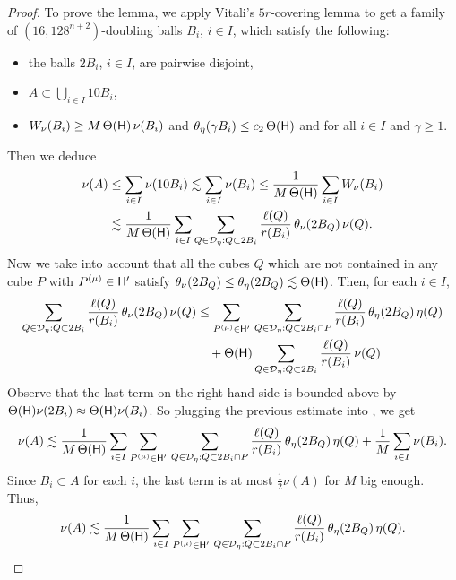 \begin{proof}
To prove the lemma, we apply Vitali's $5r$-covering lemma to get a family of $(16,128^{n+2})$-doubling balls $B_i$, $i\in I$,
which satisfy the following:
\begin{itemize}
\item the balls $2B_i$, $i\in I$, are pairwise disjoint,
\item $A\subset \bigcup_{i\in I} 10B_i$,
\item 
$W_\nu(B_i)\geq M\,\Theta({\mathsf{H}})\,\nu(B_i)$ and $\theta_\eta(\gamma B_i)\leq c_2\,\Theta({\mathsf{H}})$ and  for all $i\in I$ and $\gamma\geq1$.
\end{itemize}
Then we deduce
\begin{align}\label{eqplug6}
\nu(A) &\leq \sum_{i\in I} \nu(10B_i) \lesssim \sum_{i\in I} \nu(B_i)
\leq \frac1{M\,\Theta({\mathsf{H}})} \sum_{i\in I} W_\nu(B_i)\\
& \lesssim \frac1{M\,\Theta({\mathsf{H}})} \sum_{i\in I}\sum_{Q\in{\mathcal D}_{\eta}:Q\subset 2B_i} \frac{\ell(Q)}{r(B_i)}\,\theta_\nu(2B_Q)\,\nu(Q).\nonumber
\end{align}
Now we take into account that all the cubes $Q$ which are not contained in any cube $P$ with $P^{(\mu)}\in{\mathsf{H}}'$
satisfy $\theta_\nu(2B_Q)\leq \theta_\eta(2B_Q)\lesssim \Theta({\mathsf{H}})$. Then, for each $i\in I$,
\begin{align*}
\sum_{Q\in{\mathcal D}_{\eta}:Q\subset 2B_i} \frac{\ell(Q)}{r(B_i)}\,\theta_\nu(2B_Q)\,\nu(Q) & \leq
\sum_{P^{(\mu)}\in {\mathsf{H}}'}\,
\sum_{Q\in{\mathcal D}_{\eta}:Q\subset 2B_i\cap P} \frac{\ell(Q)}{r(B_i)}\,\theta_\eta(2B_Q)\,\eta(Q)\\
&\quad + \Theta({\mathsf{H}})\sum_{Q\in{\mathcal D}_{\eta}:Q\subset 2B_i} \frac{\ell(Q)}{r(B_i)}\, \nu(Q)\\
\end{align*}
Observe that the last term on the right hand side is bounded above by $\Theta({\mathsf{H}})\nu(2B_i)\approx
\Theta({\mathsf{H}})\nu(B_i)$. 
So plugging the previous estimate into , we get
\begin{align*}
\nu(A) \lesssim \frac{1}{M\,\Theta({\mathsf{H}})} \sum_{i\in I}
\sum_{P^{(\mu)}\in {\mathsf{H}}'}\,
\sum_{Q\in{\mathcal D}_{\eta}:Q\subset 2B_i\cap P} \frac{\ell(Q)}{r(B_i)}\,\theta_\eta(2B_Q)\,\eta(Q)
+ \frac{1}{M} \sum_{i\in I} \nu(B_i).
\end{align*}
Since $B_i\subset A$ for each $i$, the last term is at most $\frac12\nu(A)$ for $M$ big enough. Thus,
\begin{equation}\label{eqnua12}
\nu(A) \lesssim  \frac{1}{M\,\Theta({\mathsf{H}})} \sum_{i\in I}
\sum_{P^{(\mu)}\in {\mathsf{H}}'}\,
\sum_{Q\in{\mathcal D}_{\eta}:Q\subset 2B_i\cap P} \frac{\ell(Q)}{r(B_i)}\,\theta_\eta(2B_Q)\,\eta(Q).
\end{equation}


\end{proof}
